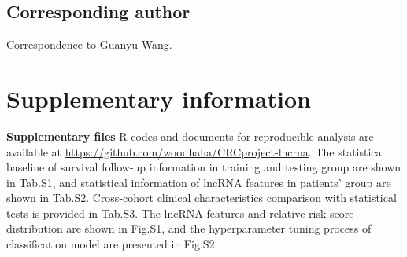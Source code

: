 \documentclass[fleqn,10pt]{wlscirep}
\begin{document}
\subsection*{Corresponding author}
Correspondence to Guanyu Wang.
\section*{Supplementary information}

\textbf{Supplementary files}
R codes and documents for reproducible analysis are available at \url{https://github.com/woodhaha/CRCproject-lncrna}.
The statistical baseline of survival follow-up information in training and testing group are shown in Tab.S1, and statistical information of lncRNA features in patients' group are shown in Tab.S2. Cross-cohort clinical characteristics comparison with statistical tests is provided in Tab.S3. The  lncRNA features and relative risk score distribution  are shown in Fig.S1, and the hyperparameter tuning process of classification model are presented in Fig.S2.
\end{document}
